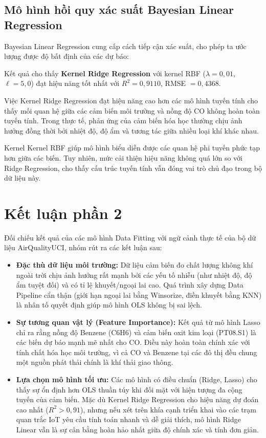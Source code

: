 \documentclass[12pt,a4paper]{report}
\begin{document}
\subsection{Mô hình hồi quy xác suất Bayesian Linear Regression}
 
Bayesian Linear Regression cung cấp cách tiếp cận xác suất, cho phép ta ước lượng được độ bất định của các dự báo:
 
Kết quả cho thấy \textbf{Kernel Ridge Regression} với kernel RBF ($\lambda = 0{,}01$, $\ell = 5{,}0$) đạt hiệu năng tốt nhất với $R^2 = 0{,}9110$, RMSE $= 0{,}4368$.

Việc Kernel Ridge Regression đạt hiệu năng cao hơn các mô hình tuyến tính cho thấy mối quan hệ giữa các cảm biến môi trường và nồng độ CO không hoàn toàn tuyến tính. Trong thực tế, phản ứng của cảm biến hóa học thường chịu ảnh hưởng đồng thời bởi nhiệt độ, độ ẩm và tương tác giữa nhiều loại khí khác nhau.

Kernel Kernel RBF giúp mô hình biểu diễn được các quan hệ phi tuyến phức tạp hơn giữa các biến. Tuy nhiên, mức cải thiện hiệu năng không quá lớn so với Ridge Regression, cho thấy cấu trúc tuyến tính vẫn đóng vai trò chủ đạo trong bộ dữ liệu này.

\section{Kết luận phần 2}
Đối chiếu kết quả của các mô hình Data Fitting với ngữ cảnh thực tế của bộ dữ liệu AirQualityUCI, nhóm rút ra các kết luận sau:
\begin{itemize}
    \item \textbf{Đặc thù dữ liệu môi trường:} Dữ liệu cảm biến đo chất lượng không khí ngoài trời chịu ảnh hưởng rất mạnh bởi các yếu tố nhiễu (như nhiệt độ, độ ẩm tuyệt đối) và có tỉ lệ khuyết/ngoại lai cao. Quá trình xây dựng Data Pipeline cẩn thận (giới hạn ngoại lai bằng Winsorize, điền khuyết bằng KNN) là nhân tố quyết định giúp mô hình OLS không bị sai lệch.
    \item \textbf{Sự tương quan vật lý (Feature Importance):} Kết quả từ mô hình Lasso chỉ ra rằng nồng độ Benzene (C6H6) và cảm biến oxit kim loại (PT08.S1) là các biến dự báo mạnh mẽ nhất cho CO. Điều này hoàn toàn chính xác với tính chất hóa học môi trường, vì cả CO và Benzene tại các đô thị đều chung một nguồn phát thải chính là khí thải giao thông.
    \item \textbf{Lựa chọn mô hình tối ưu:} Các mô hình có điều chuẩn (Ridge, Lasso) cho thấy sự ổn định hơn OLS thuần túy khi đối mặt với hiện tượng đa cộng tuyến của cảm biến. Mặc dù Kernel Ridge Regression cho hiệu năng dự đoán cao nhất ($R^2 > 0,91$), nhưng nếu xét trên khía cạnh triển khai vào các trạm quan trắc IoT yêu cầu tính toán nhanh và dễ giải thích, mô hình Ridge Linear vẫn là sự cân bằng hoàn hảo nhất giữa độ chính xác và tính đơn giản.
\end{itemize}
\end{document}
